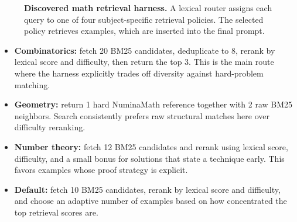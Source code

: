 \begin{figure}[t]
\centering
{}
\caption{\textbf{Discovered math retrieval harness.}
A lexical router assigns each query to one of four subject-specific retrieval policies.
The selected policy retrieves examples, which are inserted into the final prompt.}
\label{fig:math-harness-diagram}
\end{figure}

\begin{itemize}[leftmargin=*]
\item \textbf{Combinatorics:} fetch 20 BM25 candidates, deduplicate to 8, rerank by lexical score and difficulty, then return the top 3. This is the main route where the harness explicitly trades off diversity against hard-problem matching.
\item \textbf{Geometry:} return 1 hard NuminaMath reference together with 2 raw BM25 neighbors. Search consistently prefers raw structural matches here over difficulty reranking.
\item \textbf{Number theory:} fetch 12 BM25 candidates and rerank using lexical score, difficulty, and a small bonus for solutions that state a technique early. This favors examples whose proof strategy is explicit.
\item \textbf{Default:} fetch 10 BM25 candidates, rerank by lexical score and difficulty, and choose an adaptive number of examples based on how concentrated the top retrieval scores are.
\end{itemize}

